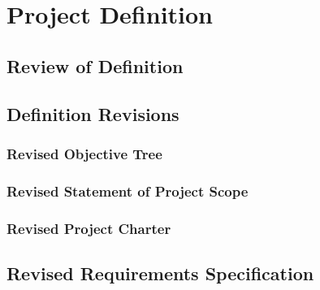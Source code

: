 \chapter{Project Definition}
\section{Review of Definition}
\section{Definition Revisions}
\subsection{Revised Objective Tree}
\subsection{Revised Statement of Project Scope}
\subsection{Revised Project Charter}
\section{Revised Requirements Specification}